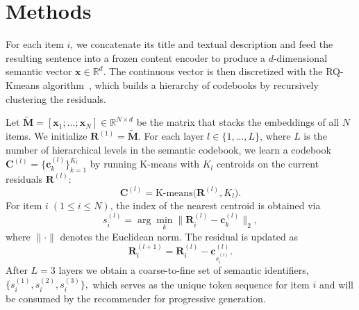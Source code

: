 \section{Methods}
For each item $i$, we concatenate its title and textual description and feed the resulting sentence into a frozen content encoder to produce a $d$-dimensional semantic vector $\mathbf{x}\in\mathbb{R}^{d}$.
The continuous vector is then discretized with the RQ-Kmeans algorithm~\citep{rqkmeans}, which builds a hierarchy of codebooks by recursively clustering the residuals.

Let $\tilde{\mathbf{M}}=[\mathbf{x}_1;\ldots;\mathbf{x}_N]\in\mathbb{R}^{N\times d}$ be the matrix that stacks the embeddings of all $N$ items.  
We initialize $\mathbf{R}^{(1)}=\tilde{\mathbf{M}}$. For each layer $l\in\{1,\ldots,L\}$, where $L$ is the number of hierarchical levels in the semantic codebook, we learn a codebook
$\mathbf{C}^{(l)}=\{\mathbf{c}^{(l)}_{k}\}_{k=1}^{K_l}$ by running K-means with $K_l$ centroids on the current residuals $\mathbf{R}^{(l)}$:
\[
\mathbf{C}^{(l)}=\text{K-means}\bigl(\mathbf{R}^{(l)},K_l\bigr).
\]
%
For item $i\;(1\le i\le N)$, the index of the nearest centroid is obtained via
\[
s^{(l)}_{i}=\arg\min_{k}\lVert\mathbf{R}^{(l)}_{i}-\mathbf{c}^{(l)}_{k}\rVert_{2},
\]
where $\lVert \cdot \lVert$  denotes the Euclidean norm. The residual is updated as
\[
\mathbf{R}^{(l+1)}_{i}= \mathbf{R}^{(l)}_{i}-\mathbf{c}^{(l)}_{s^{(l)}_{i}}.
\]
After $L=3$ layers we obtain a coarse-to-fine set of semantic identifiers,
$
\{s^{(1)}_{i},s^{(2)}_{i},s^{(3)}_{i}\},
$
which serves as the unique token sequence for item $i$ and will be consumed by the recommender for progressive generation.



